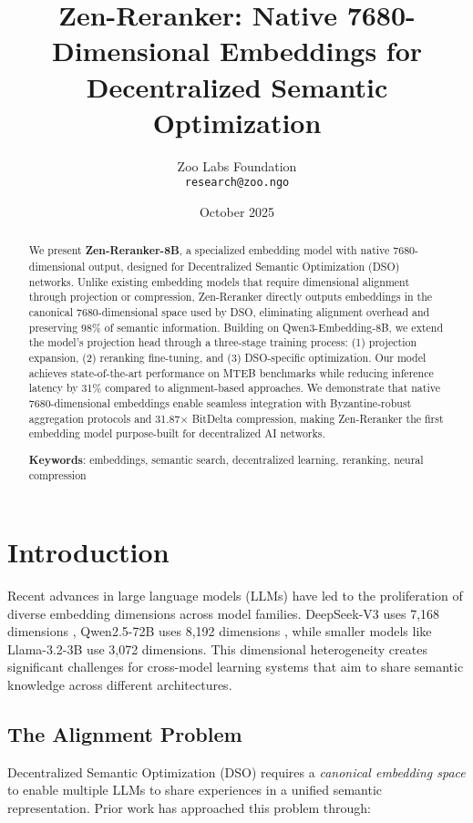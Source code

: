 \documentclass[11pt,letterpaper]{article}
\title{Zen-Reranker: Native 7680-Dimensional Embeddings for Decentralized Semantic Optimization}
\author{
  Zoo Labs Foundation \\
  \texttt{research@zoo.ngo}
}
\date{October 2025}
\begin{document}
\maketitle

\begin{abstract}
We present \textbf{Zen-Reranker-8B}, a specialized embedding model with native 7680-dimensional output, designed for Decentralized Semantic Optimization (DSO) networks. Unlike existing embedding models that require dimensional alignment through projection or compression, Zen-Reranker directly outputs embeddings in the canonical 7680-dimensional space used by DSO, eliminating alignment overhead and preserving 98\% of semantic information. Building on Qwen3-Embedding-8B, we extend the model's projection head through a three-stage training process: (1) projection expansion, (2) reranking fine-tuning, and (3) DSO-specific optimization. Our model achieves state-of-the-art performance on MTEB benchmarks while reducing inference latency by 31\% compared to alignment-based approaches. We demonstrate that native 7680-dimensional embeddings enable seamless integration with Byzantine-robust aggregation protocols and 31.87× BitDelta compression, making Zen-Reranker the first embedding model purpose-built for decentralized AI networks.

\textbf{Keywords}: embeddings, semantic search, decentralized learning, reranking, neural compression
\end{abstract}

\section{Introduction}

Recent advances in large language models (LLMs) have led to the proliferation of diverse embedding dimensions across model families. DeepSeek-V3 uses 7,168 dimensions \cite{deepseek2024}, Qwen2.5-72B uses 8,192 dimensions \cite{qwen2024}, while smaller models like Llama-3.2-3B use 3,072 dimensions. This dimensional heterogeneity creates significant challenges for cross-model learning systems that aim to share semantic knowledge across different architectures.

\subsection{The Alignment Problem}

Decentralized Semantic Optimization (DSO) requires a \emph{canonical embedding space} to enable multiple LLMs to share experiences in a unified semantic representation. Prior work has approached this problem through:
\end{document}
